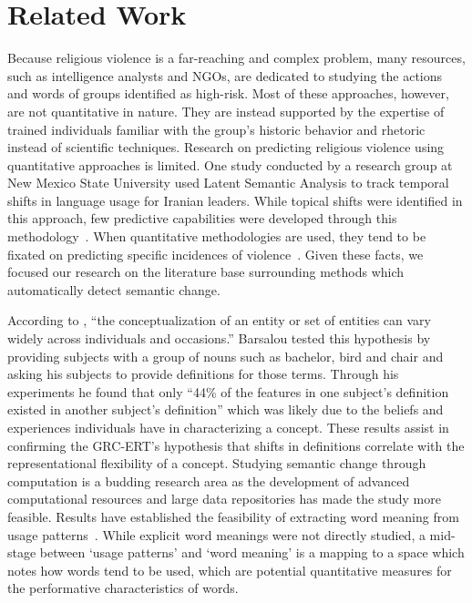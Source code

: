 \documentclass[11pt]{article}
\begin{document}
\section{Related Work}\label{relatedwork}

Because religious violence is a far-reaching and complex problem, many resources, such as intelligence analysts and NGOs, are dedicated to studying the actions and words of groups identified as high-risk. Most of these approaches, however, are not quantitative in nature. They are instead supported by the expertise of trained individuals familiar with the group’s historic behavior and rhetoric instead of scientific techniques. Research on predicting religious violence using quantitative approaches is limited. One study conducted by a research group at New Mexico State University used Latent Semantic Analysis to track temporal shifts in language usage for Iranian leaders. While topical shifts were identified in this approach, few predictive capabilities were developed through this methodology~\cite{Hacker2013}. When quantitative methodologies are used, they tend to be fixated on predicting specific incidences of violence~\cite{Yang2010}. Given these facts, we focused our research on the literature base surrounding methods which automatically detect semantic change. 

According to , “the conceptualization of an entity or set of entities can vary widely across individuals and occasions.” Barsalou tested this hypothesis by providing subjects with a group of nouns such as bachelor, bird and chair and asking his subjects to provide definitions for those terms. Through his experiments he found that only “44\% of the features in one subject’s definition existed in another subject’s definition” which was likely due to the beliefs and experiences individuals have in characterizing a concept. These results assist in confirming the GRC-ERT’s hypothesis that shifts in definitions correlate with the representational flexibility of a concept.
Studying semantic change through computation is a budding research area as the development of advanced computational resources and large data repositories has made the study more feasible. Results have established the feasibility of extracting word meaning from usage patterns~\cite{Bullinaria2007,Lin1998}. While explicit word meanings were not directly studied, a mid-stage between ‘usage patterns’ and ‘word meaning’ is a mapping to a space which notes how words tend to be used, which are potential quantitative measures for the performative characteristics of words.
\end{document}
